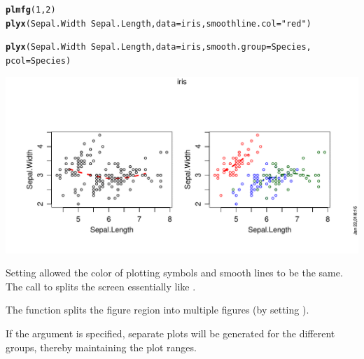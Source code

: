 \documentclass[11pt]{article}\usepackage[]{graphicx}\usepackage[]{color}
\makeatletter
\def\maxwidth{ %
  \ifdim\Gin@nat@width>\linewidth
    \linewidth
  \else
    \Gin@nat@width
  \fi
}
\newcommand{\hlnum}[1]{\textcolor[rgb]{0.686,0.059,0.569}{#1}}%
\newcommand{\hlstr}[1]{\textcolor[rgb]{0.192,0.494,0.8}{#1}}%
\newcommand{\hlopt}[1]{\textcolor[rgb]{0,0,0}{#1}}%
\newcommand{\hlstd}[1]{\textcolor[rgb]{0.345,0.345,0.345}{#1}}%
\newcommand{\hlkwc}[1]{\textcolor[rgb]{0.333,0.667,0.333}{#1}}%
\newcommand{\hlkwd}[1]{\textcolor[rgb]{0.737,0.353,0.396}{\textbf{#1}}}%
\newenvironment{kframe}{%
 \def\at@end@of@kframe{}%
 \ifinner\ifhmode%
  \def\at@end@of@kframe{\end{minipage}}%
  \begin{minipage}{\columnwidth}%
 \fi\fi%
 \def\FrameCommand##1{\hskip\@totalleftmargin \hskip-\fboxsep
 \colorbox{shadecolor}{##1}\hskip-\fboxsep
     \hskip-\linewidth \hskip-\@totalleftmargin \hskip\columnwidth}%
 \MakeFramed {\advance\hsize-\width
   \@totalleftmargin\z@ \linewidth\hsize
   \@setminipage}}%
 {\par\unskip\endMakeFramed%
 \at@end@of@kframe}
\newenvironment{knitrout}{}{} %
\makeatother
\begin{document}
\begin{knitrout}
\color{fgcolor}\begin{kframe}
\begin{alltt}
\hlkwd{plmfg}\hlstd{(}\hlnum{1}\hlstd{,}\hlnum{2}\hlstd{)}
\hlkwd{plyx}\hlstd{(Sepal.Width}\hlopt{~}\hlstd{Sepal.Length,} \hlkwc{data}\hlstd{=iris,} \hlkwc{smoothline.col}\hlstd{=}\hlstr{"red"}\hlstd{)}

\hlkwd{plyx}\hlstd{(Sepal.Width}\hlopt{~}\hlstd{Sepal.Length,} \hlkwc{data}\hlstd{=iris,} \hlkwc{smooth.group}\hlstd{=Species,}
     \hlkwc{pcol}\hlstd{=Species)}
\end{alltt}
\end{kframe}
\includegraphics[width=\maxwidth]{figure/plyx_smooth-1} 

\end{knitrout}
Setting  allowed the color of plotting symbols and smooth
lines to be the same.
The call to  splits the screen essentially like 
.

The function  splits the figure region into multiple figures 
(by setting ).

If the argument  is specified, separate plots will be generated
for the different groups, thereby maintaining the plot ranges.
\end{document}
